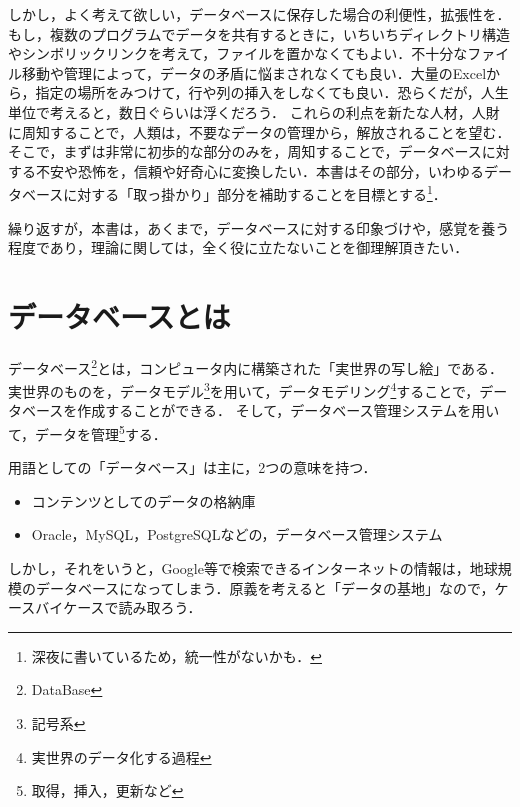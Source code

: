 \documentclass[a4paper,10pt]{jreport}
\begin{document}
\par しかし，よく考えて欲しい，データベースに保存した場合の利便性，拡張性を．もし，複数のプログラムでデータを共有するときに，いちいちディレクトリ構造やシンボリックリンクを考えて，ファイルを置かなくてもよい．不十分なファイル移動や管理によって，データの矛盾に悩まされなくても良い．大量のExcelから，指定の場所をみつけて，行や列の挿入をしなくても良い．恐らくだが，人生単位で考えると，数日ぐらいは浮くだろう．
これらの利点を新たな人材，人財に周知することで，人類は，不要なデータの管理から，解放されることを望む．そこで，まずは非常に初歩的な部分のみを，周知することで，データベースに対する不安や恐怖を，信頼や好奇心に変換したい．本書はその部分，いわゆるデータベースに対する「取っ掛かり」部分を補助することを目標とする\footnote{深夜に書いているため，統一性がないかも．}．
\par 繰り返すが，本書は，あくまで，データベースに対する印象づけや，感覚を養う程度であり，理論に関しては，全く役に立たないことを御理解頂きたい．


\chapter{データベースとは}
\label{cha:データベースとは}
データベース\footnote{DataBase}とは，コンピュータ内に構築された「実世界の写し絵」である．実世界のものを，データモデル\footnote{記号系}を用いて，データモデリング\footnote{実世界のデータ化する過程}することで，データベースを作成することができる．
そして，データベース管理システムを用いて，データを管理\footnote{取得，挿入，更新など}する．
\par 用語としての「データベース」は主に，2つの意味を持つ．
\begin{itemize}
	\item コンテンツとしてのデータの格納庫
	\item Oracle，MySQL，PostgreSQLなどの，データベース管理システム
\end{itemize}
\par しかし，それをいうと，Google等で検索できるインターネットの情報は，地球規模のデータベースになってしまう．原義を考えると「データの基地」なので，ケースバイケースで読み取ろう．
\end{document}
